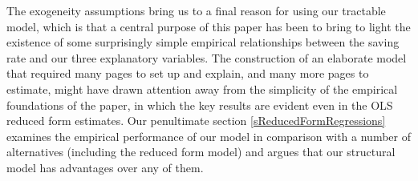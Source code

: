 
The exogeneity assumptions bring us to a final reason for using our tractable model, which is that a central purpose of this paper has been to bring to light the existence of some surprisingly simple empirical relationships between the saving rate and our three explanatory variables.  The construction of an elaborate model that required many pages to set up and explain, and many more pages to estimate, might have drawn attention away from the simplicity of the empirical foundations of the paper, in which the key results are evident even in the OLS reduced form estimates.  Our penultimate section \ref{sReducedFormRegressions} examines the empirical performance of our model in comparison with a number of alternatives (including the reduced form model) and argues that our structural model has advantages over any of them.

